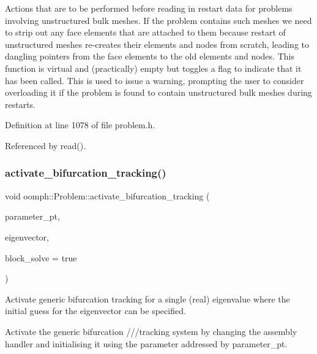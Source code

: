 Actions that are to be performed before reading in restart data for problems involving unstructured bulk meshes. If the problem contains such meshes we need to strip out any face elements that are attached to them because restart of unstructured meshes re-\/creates their elements and nodes from scratch, leading to dangling pointers from the face elements to the old elements and nodes. This function is virtual and (practically) empty but toggles a flag to indicate that it has been called. This is used to issue a warning, prompting the user to consider overloading it if the problem is found to contain unstructured bulk meshes during restarts. 



Definition at line 1078 of file problem.\+h.



Referenced by read().

\mbox{\label{classoomph_1_1Problem_a95359def89a0ee3d3df8976ab54c6591}} 
\subsubsection{\texorpdfstring{activate\+\_\+bifurcation\+\_\+tracking()}{activate\_bifurcation\_tracking()}\hspace{0.1cm}{\footnotesize\ttfamily [1/2]}}
{\footnotesize\ttfamily void oomph\+::\+Problem\+::activate\+\_\+bifurcation\+\_\+tracking (\begin{DoxyParamCaption}\item[{double $\ast$const \&}]{parameter\+\_\+pt,  }\item[{const \hyperlink{classoomph_1_1DoubleVector}{Double\+Vector} \&}]{eigenvector,  }\item[{const bool \&}]{block\+\_\+solve = {\ttfamily true} }\end{DoxyParamCaption})}



Activate generic bifurcation tracking for a single (real) eigenvalue where the initial guess for the eigenvector can be specified. 

Activate the generic bifurcation ///tracking system by changing the assembly handler and initialising it using the parameter addressed by parameter\+\_\+pt. 

